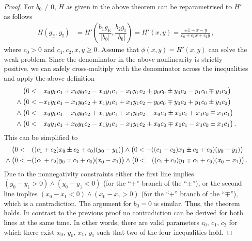 \begin{proof}
For $b_0 \neq 0$, $H$ as given in the above theorem can be reparametrised to $H'$ as follows
\begin{align*} 
	H(g_\mathrm{E}, g_\mathrm{I}) &= H'\left( \dfrac{b_1  g_\mathrm{E}}{| b_0 |}, \dfrac{b_2 g_\mathrm{I}}{| b_0 |} \right) = H'(x, y) = \frac{\pm 1 + x - y}{c_0 + c_1 x + c_2 y} \,,
\end{align*}
where $c_0 > 0 \text{ and } c_1, c_2, x, y \geq 0$.
Assume that $\phi(x, y) = H'(x, y)$ can solve the weak \XOR problem. Since the denominator in the above nonlinearity is strictly positive, we can safely cross-multiply with the denominator across the inequalities and apply the above definition
\begin{align*}
		&\hphantom{\wedge}\;\,  \bigl( 0 < \hphantom{-}  x_0 y_0 c_1 + x_0 y_0 c_2 - x_0 y_1 c_1 - x_0 y_1 c_2 + y_0 c_0 \pm y_0 c_2 - y_1 c_0 \mp y_1 c_2 \bigr) \\
		&\wedge  \bigl( 0 <           -   x_1 y_0 c_1 - x_1 y_0 c_2 + x_1 y_1 c_1 + x_1 y_1 c_2 - y_0 c_0 \mp y_0 c_2 + y_1 c_0 \pm y_1 c_2 \bigr) \\
		&\wedge  \bigl( 0 <           -   x_0 y_0 c_1 - x_0 y_0 c_2 + x_1 y_0 c_1 + x_1 y_0 c_2 - x_0 c_0 \pm x_0 c_1 + x_1 c_0 \mp x_1 c_1 \bigr) \\
		&\wedge  \bigl( 0 < \hphantom{-}  x_0 y_1 c_1 + x_0 y_1 c_2 - x_1 y_1 c_1 - x_1 y_1 c_2 + x_0 c_0 \mp x_0 c_1 - x_1 c_0 \pm x_1 c_1 \bigr) \,.
\end{align*}
This can be simplified to
\begin{align*}
		&\hphantom{\wedge}\;\, \bigl( 0 < \hphantom{-} ((c_1 + c_2) x_0 \pm c_2 + c_0) (y_0 - y_1) \bigr)
		 \wedge  \bigl( 0 <           -  ((c_1 + c_2) x_1 \pm c_2 + c_0) (y_0 - y_1) \bigr) \\
		&\wedge  \bigl( 0 <           -  ((c_1 + c_2) y_0 \mp c_1 + c_0) (x_0 - x_1) \bigr)
		 \wedge  \bigl( 0 < \hphantom{-} ((c_1 + c_2) y_1 \mp c_1 + c_0) (x_0 - x_1) \bigr) \,.
\end{align*}
Due to  the nonnegativity constraints either the first line implies $(y_0 - y_1 > 0) \wedge (y_0 - y_1 < 0)$ (for the \enquote{$+$} branch of the \enquote{$\pm$}), or the second line implies $(x_0 - x_1 < 0) \wedge (x_0 - x_1 > 0)$ (for the \enquote{$+$} branch of the \enquote{$\mp$}), which is a contradiction. The argument for $b_0 = 0$ is similar. Thus, the theorem holds. In contrast to the previous proof no contradiction can be derived for both lines at the same time. In other words, there are valid parameters $c_0$, $c_1$, $c_2$ for which there exist $x_0$, $y_0$, $x_1$, $y_1$ such that two of the four inequalities hold.
\end{proof}

